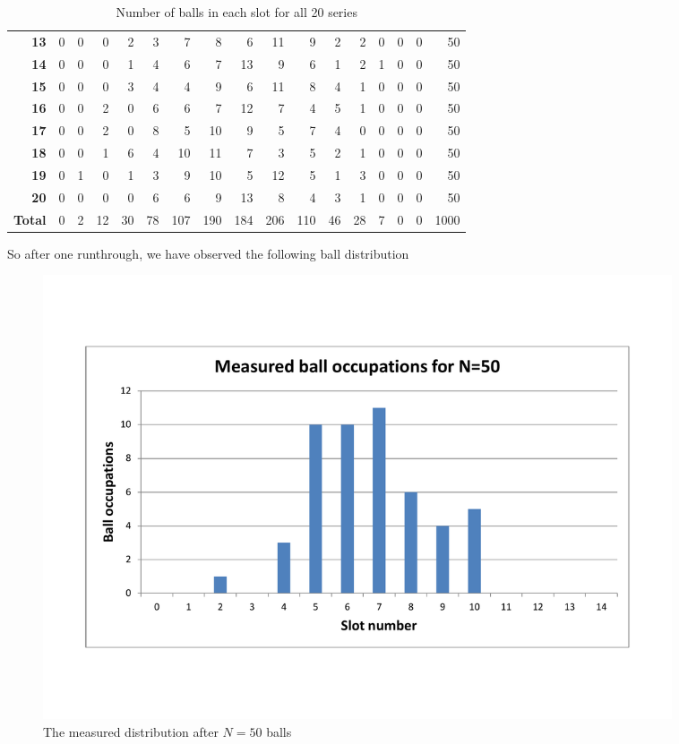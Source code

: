 \documentclass{scrreprt}
\begin{document}
\begin{table}[H]
\begin{tabular}{r|r|r|r|r|r|r|r|r|r|r|r|r|r|r|r||r}
    \textbf{13} & 0     & 0     & 0     & 2     & 3     & 7     & 8     & 6     & 11    & 9     & 2     & 2     & 0     & 0     & 0     & 50 \\
    \textbf{14} & 0     & 0     & 0     & 1     & 4     & 6     & 7     & 13    & 9     & 6     & 1     & 2     & 1     & 0     & 0     & 50 \\
    \textbf{15} & 0     & 0     & 0     & 3     & 4     & 4     & 9     & 6     & 11    & 8     & 4     & 1     & 0     & 0     & 0     & 50 \\
    \textbf{16} & 0     & 0     & 2     & 0     & 6     & 6     & 7     & 12    & 7     & 4     & 5     & 1     & 0     & 0     & 0     & 50 \\
    \textbf{17} & 0     & 0     & 2     & 0     & 8     & 5     & 10    & 9     & 5     & 7     & 4     & 0     & 0     & 0     & 0     & 50 \\
    \textbf{18} & 0     & 0     & 1     & 6     & 4     & 10    & 11    & 7     & 3     & 5     & 2     & 1     & 0     & 0     & 0     & 50 \\
    \textbf{19} & 0     & 1     & 0     & 1     & 3     & 9     & 10    & 5     & 12    & 5     & 1     & 3     & 0     & 0     & 0     & 50 \\
    \textbf{20} & 0     & 0     & 0     & 0     & 6     & 6     & 9     & 13    & 8     & 4     & 3     & 1     & 0     & 0     & 0     & 50 \\
    \hline
    \textbf{Total} & 0     & 2     & 12    & 30    & 78    & 107   & 190   & 184   & 206   & 110   & 46    & 28    & 7     & 0     & 0     & 1000 \\
    \hline
    \end{tabular}%
  \label{tab:addlabel}%
  \caption{Number of balls in each slot for all 20 series}
\end{table}%

So after one runthrough, we have observed the following ball distribution

\begin{figure}[H]
    \center   
        \includegraphics[width=0.9\textwidth]{img/ball_occup_n_50}
        \caption{The measured distribution after $N=50$ balls}
\end{figure}
\end{document}
